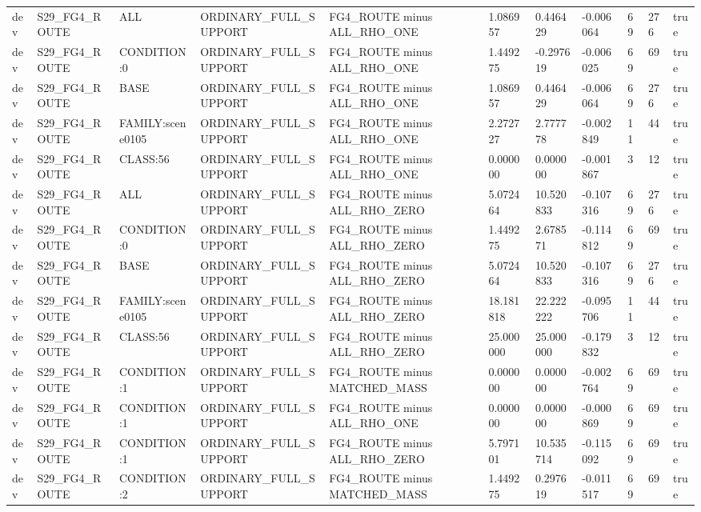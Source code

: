 \begin{tabular}{lllllllllll}
dev & S29\_FG4\_ROUTE & ALL & ORDINARY\_FULL\_SUPPORT & FG4\_ROUTE minus ALL\_RHO\_ONE & 1.086957 & 0.446429 & -0.006064 & 69 & 276 & true \\
dev & S29\_FG4\_ROUTE & CONDITION:0 & ORDINARY\_FULL\_SUPPORT & FG4\_ROUTE minus ALL\_RHO\_ONE & 1.449275 & -0.297619 & -0.006025 & 69 & 69 & true \\
dev & S29\_FG4\_ROUTE & BASE & ORDINARY\_FULL\_SUPPORT & FG4\_ROUTE minus ALL\_RHO\_ONE & 1.086957 & 0.446429 & -0.006064 & 69 & 276 & true \\
dev & S29\_FG4\_ROUTE & FAMILY:scene0105 & ORDINARY\_FULL\_SUPPORT & FG4\_ROUTE minus ALL\_RHO\_ONE & 2.272727 & 2.777778 & -0.002849 & 11 & 44 & true \\
dev & S29\_FG4\_ROUTE & CLASS:56 & ORDINARY\_FULL\_SUPPORT & FG4\_ROUTE minus ALL\_RHO\_ONE & 0.000000 & 0.000000 & -0.001867 & 3 & 12 & true \\
dev & S29\_FG4\_ROUTE & ALL & ORDINARY\_FULL\_SUPPORT & FG4\_ROUTE minus ALL\_RHO\_ZERO & 5.072464 & 10.520833 & -0.107316 & 69 & 276 & true \\
dev & S29\_FG4\_ROUTE & CONDITION:0 & ORDINARY\_FULL\_SUPPORT & FG4\_ROUTE minus ALL\_RHO\_ZERO & 1.449275 & 2.678571 & -0.114812 & 69 & 69 & true \\
dev & S29\_FG4\_ROUTE & BASE & ORDINARY\_FULL\_SUPPORT & FG4\_ROUTE minus ALL\_RHO\_ZERO & 5.072464 & 10.520833 & -0.107316 & 69 & 276 & true \\
dev & S29\_FG4\_ROUTE & FAMILY:scene0105 & ORDINARY\_FULL\_SUPPORT & FG4\_ROUTE minus ALL\_RHO\_ZERO & 18.181818 & 22.222222 & -0.095706 & 11 & 44 & true \\
dev & S29\_FG4\_ROUTE & CLASS:56 & ORDINARY\_FULL\_SUPPORT & FG4\_ROUTE minus ALL\_RHO\_ZERO & 25.000000 & 25.000000 & -0.179832 & 3 & 12 & true \\
dev & S29\_FG4\_ROUTE & CONDITION:1 & ORDINARY\_FULL\_SUPPORT & FG4\_ROUTE minus MATCHED\_MASS & 0.000000 & 0.000000 & -0.002764 & 69 & 69 & true \\
dev & S29\_FG4\_ROUTE & CONDITION:1 & ORDINARY\_FULL\_SUPPORT & FG4\_ROUTE minus ALL\_RHO\_ONE & 0.000000 & 0.000000 & -0.000869 & 69 & 69 & true \\
dev & S29\_FG4\_ROUTE & CONDITION:1 & ORDINARY\_FULL\_SUPPORT & FG4\_ROUTE minus ALL\_RHO\_ZERO & 5.797101 & 10.535714 & -0.115092 & 69 & 69 & true \\
dev & S29\_FG4\_ROUTE & CONDITION:2 & ORDINARY\_FULL\_SUPPORT & FG4\_ROUTE minus MATCHED\_MASS & 1.449275 & 0.297619 & -0.011517 & 69 & 69 & true \\

\end{tabular}
